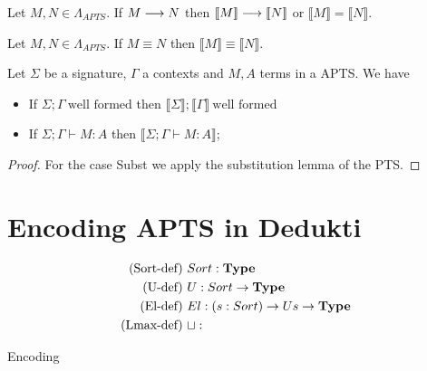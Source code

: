 \documentclass[]{StandardTemplate}
\begin{document}
\begin{lem}[]
Let $ M, N \in \Lambda_{APTS} $. If $ M \longrightarrow N $ then $ \llbracket M \rrbracket \longrightarrow \llbracket N \rrbracket $ or $ \llbracket M \rrbracket = \llbracket N \rrbracket $.
\end{lem}

\begin{cor}[]
Let $ M, N \in \Lambda_{APTS} $. If $ M \equiv N $ then $ \llbracket M \rrbracket \equiv \llbracket N \rrbracket $.
\end{cor}

\begin{thm}[Conservativity]
  Let $ \Sigma $ be a signature, $ \Gamma $ a contexts and $ M, A $ terms in a APTS. We have
  \begin{itemize}
  \item If $ \Sigma; \Gamma~\text{well formed} $ then  $ \llbracket \Sigma  \rrbracket; \llbracket  \Gamma  \rrbracket~\text{well formed} $
  \item If $  \Sigma; \Gamma \vdash M : A  $ then $ \llbracket \Sigma; \Gamma \vdash M : A \rrbracket $;    
  \end{itemize}
\end{thm}
\begin{proof}
For the case Subst we apply the substitution lemma of the PTS.
\end{proof}

\section{Encoding APTS in Dedukti}
\label{sec:encoding}

\begin{align*}
  \text{(Sort-def) }&Sort : \textbf{Type} \\
  \text{(U-def) }&U : Sort \to \textbf{Type} \\
  \text{(El-def) }&El : (s : Sort) \to U s \to \textbf{Type} \\
  \text{(Lmax-def) }&\sqcup : 
\end{align*}

Encoding
\end{document}
